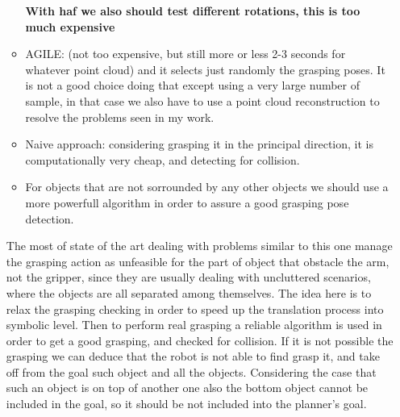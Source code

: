 \begin{itemize}
\begin{itemize}
\textbf{With haf we also should test different rotations, this is too much expensive}
\item AGILE: (not too expensive, but still more or less 2-3 seconds for whatever point cloud) and it selects just randomly the grasping poses. It is not a good choice doing that except using a very large number of sample, in that case we also have to use a point cloud reconstruction to resolve the problems seen in my work. 
\item Naive approach: considering grasping it in the principal direction, it is computationally very cheap, and detecting for collision.
\item For objects that are not sorrounded by any other objects we should use a more powerfull algorithm in order to assure a good grasping pose detection.
\end{itemize} 
The most of state of the art dealing with problems similar to this one manage the grasping action as unfeasible for the part of object that obstacle the arm, not the gripper, since they are usually dealing with uncluttered scenarios, where the objects are all separated among themselves. The idea here is to relax the grasping checking in order to speed up the translation process into symbolic level. Then to perform real grasping a reliable algorithm is used in order to get a good grasping, and checked for collision. If it is not possible the grasping we can deduce that the robot is not able to find grasp it, and take off from the goal such object and all the objects. Considering the case that such an object is on top of another one also the bottom object cannot be included in the goal, so it should be not included into the planner's goal.
\end{itemize}
\fi




